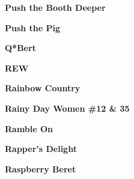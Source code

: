 \newline
\vspace{10pt} 
\begin{center}\textbf{Push the Booth Deeper}\end{center}
\newline
\vspace{10pt} 
\begin{center}\textbf{Push the Pig}\end{center}
\newline
\vspace{10pt} 
\begin{center}\textbf{Q*Bert}\end{center}
\newline
\vspace{10pt} 
\begin{center}\textbf{REW}\end{center}
\newline
\vspace{10pt} 
\begin{center}\textbf{Rainbow Country}\end{center}
\newline
\vspace{10pt} 
\begin{center}\textbf{Rainy Day Women \#12 \& 35}\end{center}
\newline
\vspace{10pt} 
\begin{center}\textbf{Ramble On}\end{center}
\newline
\vspace{10pt} 
\begin{center}\textbf{Rapper's Delight}\end{center}
\newline
\vspace{10pt} 
\begin{center}\textbf{Raspberry Beret}\end{center}
\newline
\vspace{10pt} 
